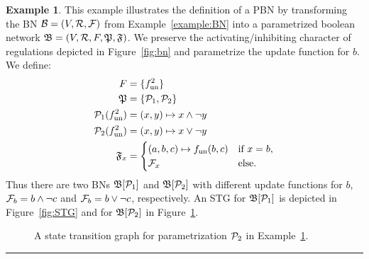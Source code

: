 \documentclass[
	digital, oneside, nosansbold, nocolorbold, nolot, nolof
]{fithesis4}
\theoremstyle{definition}
\theoremstyle{definition}
\newtheorem{example}{Example}
\newenvironment{lexample}
    {\begin{example}}
    {\par\hspace{\stretch{1}}\rule{0.2\textwidth}{0.01ex}\hspace{\stretch{1}}
     \par\end{example}}
\DeclarePairedDelimiter{\set}{\{}{\}}
\begin{document}
\begin{lexample} \label{example:PBN}
This example illustrates the definition of a PBN by transforming the BN
$\mathcal{B} = (V, \mathcal{R}, \mathcal{F})$ from Example~\ref{example:BN} into
a parametrized boolean network $\mathfrak{B} = (V, \mathcal{R}, F, \mathfrak{P},
\mathfrak{F})$. We preserve the activating/inhibiting character of regulations
depicted in Figure~\ref{fig:bn} and parametrize the update function for $b$.
We define:
\begin{align*}
    F & = \set{\unf{f}^2} \\
    \paronset{P} & = \set{\paron{P}_1, \paron{P}_2} \\
    \paron{P}_1(\unf{f}^2) & = (x, y) \mapsto x \land \lnot y \\
    \paron{P}_2(\unf{f}^2) & = (x, y) \mapsto x \lor \lnot y \\
    \PBNUFs{F}_x & =
        \begin{cases}
            (a, b, c) \mapsto \unf{f}(b, c) & \text{if } x = b,\\
            \BNUFs{F}_x & \text{else}.
        \end{cases} \\
\end{align*}
Thus there are two BNs $\mathfrak{B}[\mathcal{P}_1]$ and $\mathfrak{B}[\mathcal{P}_2]$
with different update functions for $b$, $\mathcal{F}_b = b \land \lnot c$
and $\mathcal{F}_b = b \lor \lnot c$, respectively. An STG for
$\mathfrak{B}[\mathcal{P}_1]$ is depicted in Figure~\ref{fig:STG}
and for $\mathfrak{B}[\mathcal{P}_2]$ in Figure~\ref{fig:STG2}.
\begin{figure}[!ht]
\centering
{}
\caption{A state transition graph for parametrization $\mathcal{P}_2$ in
    Example~\ref{example:PBN}.}
\label{fig:STG2}
\end{figure}
\end{lexample}
\end{document}
